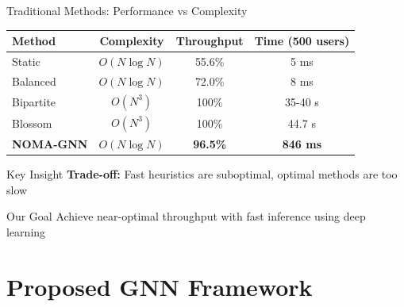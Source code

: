 \documentclass[aspectratio=169]{beamer}
\begin{document}
\begin{frame}{Traditional Methods: Performance vs Complexity}
    \begin{table}
        \centering
        \small
        \begin{tabular}{lccc}
            \toprule
            \textbf{Method} & \textbf{Complexity} & \textbf{Throughput} & \textbf{Time (500 users)} \\
            \midrule
            Static & $O(N \log N)$ & 55.6\% & 5 ms \\
            Balanced & $O(N \log N)$ & 72.0\% & 8 ms \\
            Bipartite & $O(N^3)$ & 100\% & 35-40 s \\
            Blossom & $O(N^3)$ & 100\% & 44.7 s \\
            \midrule
            \textbf{NOMA-GNN} & $O(N \log N)$ & \textbf{96.5\%} & \textbf{846 ms} \\
            \bottomrule
        \end{tabular}
    \end{table}
    
    \vspace{0.5cm}
    
    \begin{block}{Key Insight}
        \textbf{Trade-off:} Fast heuristics are suboptimal, optimal methods are too slow
    \end{block}
    
    \begin{exampleblock}{Our Goal}
        Achieve near-optimal throughput with fast inference using deep learning
    \end{exampleblock}
\end{frame}

\section{Proposed GNN Framework}
\end{document}

